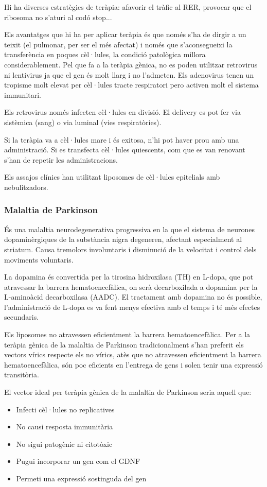 Hi ha diverses estratègies de teràpia: afavorir el tràfic al RER,
provocar que el ribosoma no s'aturi al codó stop...

Els avantatges que hi ha per aplicar teràpia és que només s'ha de
dirgir a un teixit (el pulmonar, per ser el més afectat) i només que
s'aconsegueixi la transferència en poques cèl·lules, la condició
patològica millora considerablement. Pel que fa a la teràpia gènica,
no es poden utilitzar retrovirus ni lentivirus ja que el gen és molt
llarg i no l'admeten. Els adenovirus tenen un tropisme molt elevat per
cèl·lules tracte respiratori pero activen molt el sistema immunitari.

Els retrovirus només infecten cèl·lules en divisió. El delivery es pot
fer via sistèmica (sang) o via luminal (vies respiratòries).

Si la teràpia va a cèl·lules mare i és exitosa, n'hi pot haver prou
amb una administració. Si es transfecta cèl·lules quiescents, com que
es van renovant s'han de repetir les administracions.

Els assajos clínics han utilitzat liposomes de cèl·lules epitelials
amb nebulitzadors.

\subsubsection{Malaltia de Parkinson}
\label{sec:malalt-de-park}
És una malaltia neurodegenerativa progressiva en la que el sistema de
neurones dopaminèrgiques de la substància nigra degeneren, afectant
especialment al striatum. Causa tremolors involuntaris i disminució de
la velocitat i control dels moviments voluntaris.

La dopamina és convertida per la tirosina hidroxilasa (TH) en L-dopa,
que pot atravessar la barrera hematoencefàlica, on serà decarboxilada
a dopamina per la L-aminoàcid decarboxilasa (AADC). El tractament amb
dopamina no és possible, l'administració de L-dopa es va fent menys
efectiva amb el temps i té més efectes secundaris.

Els liposomes no atravessen eficientment la barrera
hematoencefàlica. Per a la teràpia gènica de la malaltia de Parkinson
tradicionalment s'han preferit els vectors vírics respecte els no
vírics, atès que no atravessen eficientment la barrera
hematoencefàlica, són poc eficients en l'entrega de gens i solen tenir
una expressió transitòria.

El vector ideal per teràpia gènica de la malaltia de Parkinson seria aquell que:
\begin{itemize}
\item Infecti cèl·lules no replicatives
\item No causi resposta immunitària
\item No sigui patogènic ni citotòxic
\item Pugui incorporar un gen com el GDNF
\item Permeti una expressió sostinguda del gen
\end{itemize}

